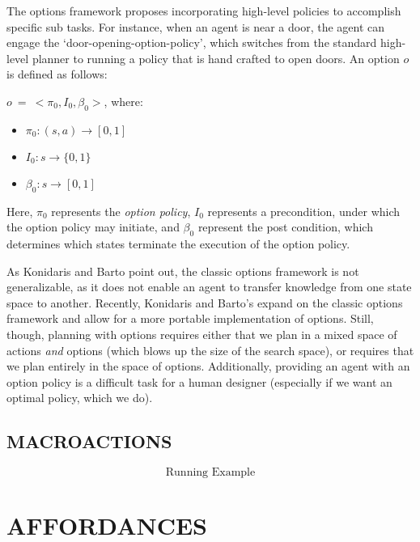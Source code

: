 \documentclass[]{article}
\newcommand{\ignore}[1]{}
\begin{document}
The options framework proposes incorporating high-level policies to accomplish specific sub tasks. For instance, when an agent is near a door, the agent can engage the `door-opening-option-policy', which switches from the standard high-level planner to running a policy that is hand crafted to open doors. An option $o$ is defined as follows:

$o\ =\ <\pi_0, I_0, \beta_0>$, where:

\begin{itemize}
\item[] $\pi_0 : (s,a) \rightarrow [0,1]$
\item[] $I_0 : s \rightarrow \{0,1\}$
\item[] $\beta_0 : s \rightarrow [0,1]$
\end{itemize}

Here, $\pi_0$ represents the {\it option policy}, $I_0$ represents a precondition, under which the option policy may initiate, and $\beta_0$ represent the post condition, which determines which states terminate the execution of the option policy.

As Konidaris and Barto point out, the classic options framework is not generalizable, as it does not enable an agent to transfer knowledge from one state space to another. Recently, Konidaris and Barto's \ignore{cite} expand on the classic options framework and allow for a more portable implementation of options. Still, though, planning with options requires either that we plan in a mixed space of actions {\it and} options (which blows up the size of the search space), or requires that we plan entirely in the space of options. Additionally, providing an agent with an option policy is a difficult task for a human designer (especially if we want an optimal policy, which we do).

\subsection{MACROACTIONS}

\[
\boxed{\text{Running Example}}
\]

\section{AFFORDANCES}

\end{document}
